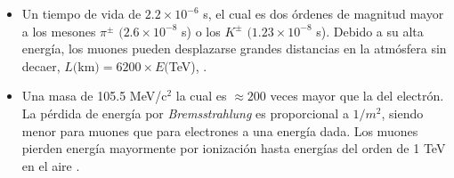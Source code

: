 \begin{itemize}
\item Un tiempo de vida de $2.2 \times 10^{-6}$ s, el cual es dos órdenes de magnitud mayor a los mesones  $\pi^{\pm}$ $(2.6 \times 10^{-8}$ s) o los $K^{\pm}$ $(1.23 \times 10^{-8}$ s). Debido a su alta energía, los muones pueden desplazarse grandes distancias en la atmósfera sin decaer, $L($km$) = 6200\times E($TeV), \cite{Procureur2018, Nagamine2003}. 

\item Una masa de 105.5 MeV/c$^2$ la cual es $\approx200$ veces mayor que la del electrón. La pérdida de energía por \textit{Bremsstrahlung} es proporcional a $1/m^2$, siendo menor para muones que para electrones a una energía dada. Los muones pierden energía mayormente por ionización hasta energías del orden de 1 TeV en el aire \cite{Groom2001}.

\end{itemize}
